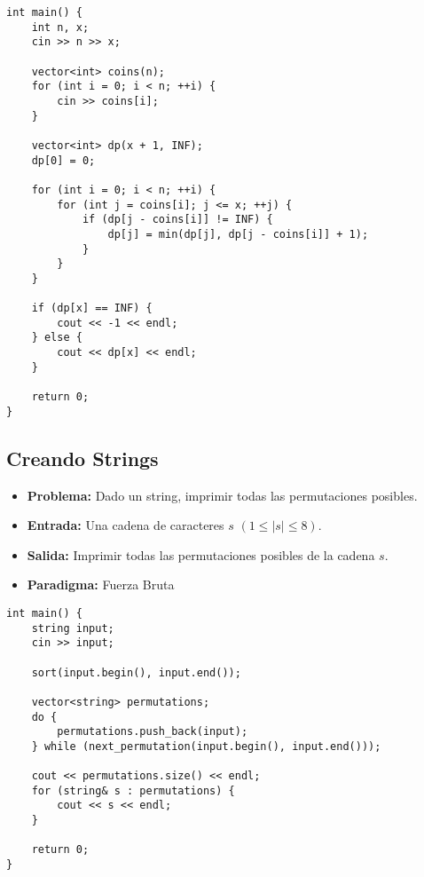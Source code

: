 \begin{lstlisting}[style=cpp]
int main() {
    int n, x;
    cin >> n >> x;

    vector<int> coins(n);
    for (int i = 0; i < n; ++i) {
        cin >> coins[i];
    }

    vector<int> dp(x + 1, INF);
    dp[0] = 0; 

    for (int i = 0; i < n; ++i) {
        for (int j = coins[i]; j <= x; ++j) {
            if (dp[j - coins[i]] != INF) {
                dp[j] = min(dp[j], dp[j - coins[i]] + 1);
            }
        }
    }

    if (dp[x] == INF) {
        cout << -1 << endl;
    } else {
        cout << dp[x] << endl;
    }

    return 0;
}
\end{lstlisting}

\subsection{Creando Strings}
\begin{itemize}
  \item \textbf{Problema: }Dado un string, imprimir todas las permutaciones posibles. 
  \item \textbf{Entrada: }Una cadena de caracteres $s$ $(1 \leq |s| \leq 8)$. 
  \item \textbf{Salida: }Imprimir todas las permutaciones posibles de la cadena $s$. 

  \item \textbf{Paradigma: } Fuerza Bruta
\end{itemize}
\begin{lstlisting}[style=cpp]
int main() {
    string input;
    cin >> input;

    sort(input.begin(), input.end());

    vector<string> permutations;
    do {
        permutations.push_back(input);
    } while (next_permutation(input.begin(), input.end()));

    cout << permutations.size() << endl;
    for (string& s : permutations) {
        cout << s << endl;
    }

    return 0;
}
\end{lstlisting}

